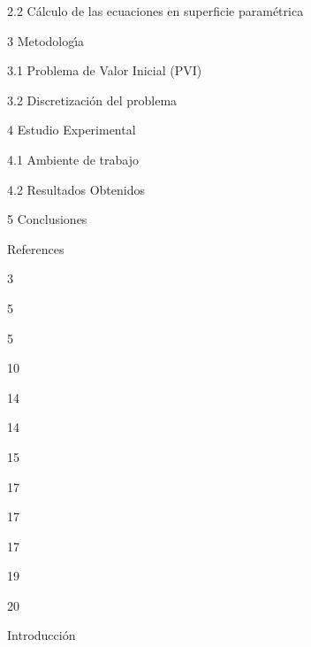 \documentclass[a4paper,portrait,12pt]{article}
\begin{document}
\begin{flushleft}
2.2 Cálculo de las ecuaciones en superficie paramétrica
\end{flushleft}


\begin{flushleft}
3 Metodolog\i{}́a
\end{flushleft}


\begin{flushleft}
3.1 Problema de Valor Inicial (PVI)
\end{flushleft}


\begin{flushleft}
3.2 Discretización del problema
\end{flushleft}


\begin{flushleft}
4 Estudio Experimental
\end{flushleft}


\begin{flushleft}
4.1 Ambiente de trabajo
\end{flushleft}


\begin{flushleft}
4.2 Resultados Obtenidos
\end{flushleft}


\begin{flushleft}
5 Conclusiones
\end{flushleft}


\begin{flushleft}
References
\end{flushleft}





3


5


5


10


14


14


15


17


17


17


19


20










\begin{flushleft}
Introducción
\end{flushleft}
\end{document}
